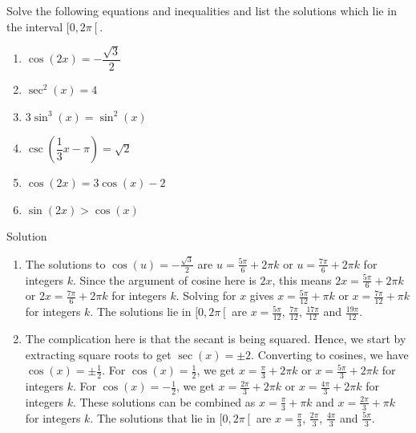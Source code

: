 \begin{example}  \label{TrigEqnEx1} Solve the following equations and inequalities and list the solutions which lie in the interval $[0,2\pi\left[\right.$.


\begin{multicols}{2}
\begin{enumerate}
\item  $\cos(2x) = -\dfrac{\sqrt{3}}{2}$

\item  $\sec^{2}(x) = 4$
\item  $3\sin^{3}(x) = \sin^{2}(x)$

\item  $\csc\left(\dfrac{1}{3}x-\pi \right) = \sqrt{2}$

\item  $\cos(2x) = 3\cos(x) - 2$
\item  $\sin(2x) > \cos(x)$
\end{enumerate}
\end{multicols}

Solution 

\begin{enumerate}

\item  The solutions to $\cos(u) =-\frac{\sqrt{3}}{2}$ are $u = \frac{5\pi}{6} + 2\pi k$ or $u = \frac{7\pi}{6} + 2\pi k$ for integers $k$.  Since the argument of cosine here is $2x$, this means $2x = \frac{5\pi}{6} + 2\pi k$ or $2x = \frac{7\pi}{6} + 2\pi k$ for integers $k$.  Solving for $x$ gives $x = \frac{5\pi}{12} + \pi k$ or $x = \frac{7\pi}{12} + \pi k$ for integers $k$.  
The solutions lie in $[0,2\pi\left[\right.$ are  $x = \frac{5\pi}{12}$,  $\frac{7\pi}{12}$, $\frac{17\pi}{12}$ and $\frac{19\pi}{12}$.  



\item The complication here is that the secant is being squared.  Hence, we start by extracting square roots to get $\sec(x) = \pm 2$. Converting to cosines, we have  $\cos(x) = \pm \frac{1}{2}$.  For $\cos(x) = \frac{1}{2}$, we get $x = \frac{\pi}{3} + 2\pi k$ or $x = \frac{5\pi}{3} + 2\pi k$ for integers $k$.  For $\cos(x) = -\frac{1}{2}$, we get $x = \frac{2\pi}{3} + 2\pi k$ or $x = \frac{4\pi}{3} + 2\pi k$ for integers $k$.  These solutions can be combined as $x = \frac{\pi}{3} + \pi k$ and $x = \frac{2\pi}{3} + \pi k$ for integers $k$.   The solutions that lie in $[0,2\pi\left[\right.$ are $x = \frac{\pi}{3}$, $\frac{2\pi}{3}$, $\frac{4\pi}{3}$ and $\frac{5\pi}{3}$.  



\end{enumerate}
\end{example}
